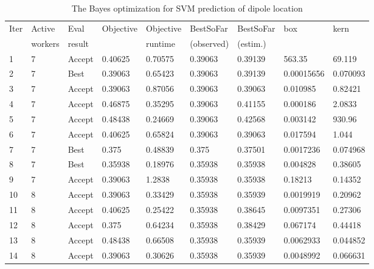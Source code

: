 \documentclass[5p]{elsarticle}
\begin{document}
\begin{frontmatter}
\begin{table}[h!]
  \small
  \begin{center}
    \caption{The Bayes optimization for SVM prediction of dipole location}
    \label{tab:table_1}
    \begin{tabular}{l | l | l|l|l|l|l|l|l}
\hline
Iter & Active  & Eval& Objective& Objective   & BestSoFar & BestSoFar&  box & kern \\
 & workers & result & & runtime     & (observed)  & (estim.)    &              &    \\
1 &       7 & Accept &     0.40625 &     0.70575 &     0.39063 &     0.39139 &       563.35 &       69.119 \\
2 &       7 & Best   &     0.39063 &     0.65423 &     0.39063 &     0.39139 &   0.00015656 &     0.070093 \\
3 &       7 & Accept &     0.39063 &     0.87056 &     0.39063 &     0.39063 &     0.010985 &      0.82421 \\
4 &       7 & Accept &     0.46875 &     0.35295 &     0.39063 &     0.41155 &     0.000186 &       2.0833 \\
5 &       7 & Accept &     0.48438 &     0.24669 &     0.39063 &     0.42568 &     0.003142 &       930.96 \\
6 &       7 & Accept &     0.40625 &     0.65824 &     0.39063 &     0.39063 &     0.017594 &        1.044 \\
7 &       7 & Best   &       0.375 &     0.48839 &       0.375 &     0.37501 &    0.0017236 &     0.074968 \\
8 &       7 & Best   &     0.35938 &     0.18976 &     0.35938 &     0.35938 &     0.004828 &      0.38605 \\
9 &       7 & Accept &     0.39063 &      1.2838 &     0.35938 &     0.35938 &      0.18213 &      0.14352 \\
10 &       8 & Accept &     0.39063 &     0.33429 &     0.35938 &     0.35939 &    0.0019919 &      0.20962 \\
11 &       8 & Accept &     0.40625 &     0.25422 &     0.35938 &     0.38645 &    0.0097351 &      0.27306 \\
12 &       8 & Accept &       0.375 &     0.64234 &     0.35938 &     0.38429 &     0.067174 &      0.44418 \\
13 &       8 & Accept &     0.48438 &     0.66508 &     0.35938 &     0.35939 &    0.0062933 &     0.044852 \\
14 &       8 & Accept &     0.39063 &     0.30626 &     0.35938 &     0.35939 &    0.0048992 &     0.066631 \\

\end{tabular}
\end{center}
\end{table}
\end{frontmatter}
\end{document}
